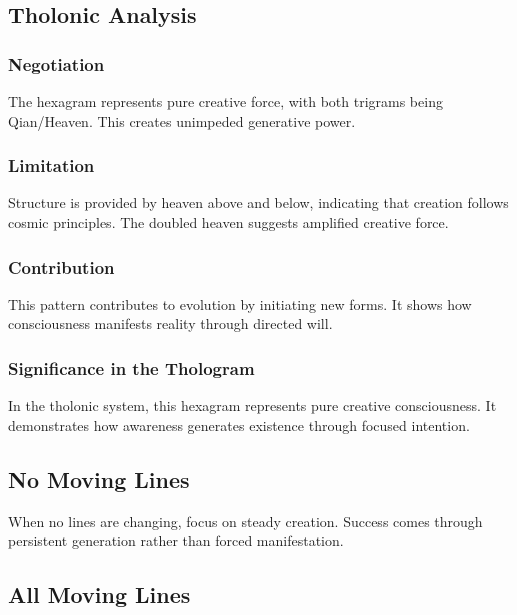 \documentclass[
]{article}
\begin{document}
\subsection{Tholonic Analysis}\label{tholonic-analysis}

\subsubsection{Negotiation}\label{negotiation}

The hexagram represents pure creative force, with both trigrams being
Qian/Heaven. This creates unimpeded generative power.

\subsubsection{Limitation}\label{limitation}

Structure is provided by heaven above and below, indicating that
creation follows cosmic principles. The doubled heaven suggests
amplified creative force.

\subsubsection{Contribution}\label{contribution}

This pattern contributes to evolution by initiating new forms. It shows
how consciousness manifests reality through directed will.

\subsubsection{Significance in the
Thologram}\label{significance-in-the-thologram}

In the tholonic system, this hexagram represents pure creative
consciousness. It demonstrates how awareness generates existence through
focused intention.

\subsection{No Moving Lines}\label{no-moving-lines}

When no lines are changing, focus on steady creation. Success comes
through persistent generation rather than forced manifestation.

\subsection{All Moving Lines}\label{all-moving-lines}
\end{document}

